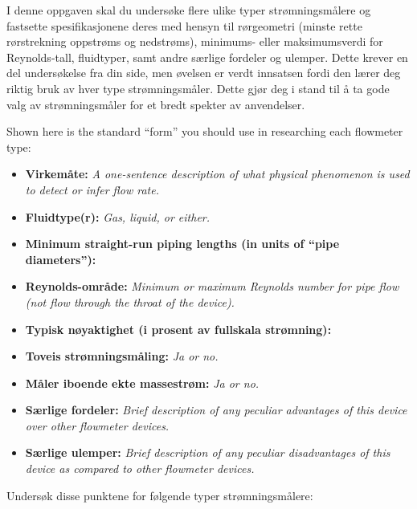 

I denne oppgaven skal du undersøke flere ulike typer strømningsmålere og fastsette spesifikasjonene deres med hensyn til rørgeometri (minste rette rørstrekning oppstrøms og nedstrøms), minimums- eller maksimumsverdi for Reynolds-tall, fluidtyper, samt andre særlige fordeler og ulemper. Dette krever en del undersøkelse fra din side, men øvelsen er verdt innsatsen fordi den lærer deg riktig bruk av hver type strømningsmåler. Dette gjør deg i stand til å ta gode valg av strømningsmåler for et bredt spekter av anvendelser.

Shown here is the standard ``form'' you should use in researching each flowmeter type:

\vskip 10pt

\begin{itemize}
\item{} {\bf Virkemåte:} {\it A one-sentence description of what physical phenomenon is used to detect or infer flow rate.}
\item{} {\bf Fluidtype(r):} {\it Gas, liquid, or either.}
\item{} {\bf Minimum straight-run piping lengths (in units of ``pipe diameters''):}
\item{} {\bf Reynolds-område:} {\it Minimum or maximum Reynolds number for pipe flow (not flow through the throat of the device).}
\item{} {\bf Typisk nøyaktighet (i prosent av fullskala strømning):}  
\item{} {\bf Toveis strømningsmåling:} {\it Ja or no.}
\item{} {\bf Måler iboende ekte massestrøm:} {\it Ja or no.}
\item{} {\bf Særlige fordeler:} {\it Brief description of any peculiar advantages of this device over other flowmeter devices.}
\item{} {\bf Særlige ulemper:} {\it Brief description of any peculiar disadvantages of this device as compared to other flowmeter devices.}
\end{itemize}


\vskip 10pt

Undersøk disse punktene for følgende typer strømningsmålere:

